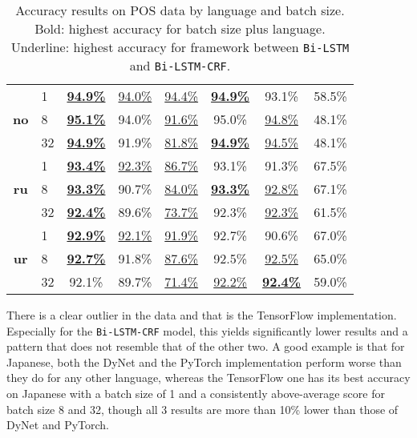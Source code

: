 \begin{table}[h]
\begin{tabular}{c l c c c|c c c}
        \cmidrule(lr){1-8}
        \multirow{3}{*}{\bfseries no}
        &  1 & \underline{\textbf{94.9\%}} & \underline{94.0\%} & \underline{94.4\%} & \underline{\textbf{94.9\%}} & 93.1\% & 58.5\% \\
        &  8 & \underline{\textbf{95.1\%}} & 94.0\% & \underline{91.6\%} & 95.0\% & \underline{94.8\%} & 48.1\% \\
        & 32 & \underline{\textbf{94.9\%}} & 91.9\% & \underline{81.8\%} & \underline{\textbf{94.9\%}} & \underline{94.5\%} & 48.1\% \\

        \cmidrule(lr){1-8}
        \multirow{3}{*}{\bfseries ru}
        &  1 & \underline{\textbf{93.4\%}} & \underline{92.3\%} & \underline{86.7\%} & 93.1\% & 91.3\% & 67.5\% \\
        &  8 & \underline{\textbf{93.3\%}} & 90.7\% & \underline{84.0\%} & \underline{\textbf{93.3\%}} & \underline{92.8\%} & 67.1\% \\
        & 32 & \underline{\textbf{92.4\%}} & 89.6\% & \underline{73.7\%} & 92.3\% & \underline{92.3\%} & 61.5\% \\

        \cmidrule(lr){1-8}
        \multirow{3}{*}{\bfseries ur}
        &  1 & \underline{\textbf{92.9\%}} & \underline{92.1\%} & \underline{91.9\%} & 92.7\% & 90.6\% & 67.0\% \\
        &  8 & \underline{\textbf{92.7\%}} & 91.8\% & \underline{87.6\%} & 92.5\% & \underline{92.5\%} & 65.0\% \\
        & 32 & 92.1\% & 89.7\% & \underline{71.4\%} & \underline{92.2\%} & \underline{\textbf{92.4\%}} & 59.0\% \\
        \bottomrule
    \end{tabular}
    \caption{%
      Accuracy results on POS data by language and batch size.
      Bold: highest accuracy for batch size plus language.
      Underline: highest accuracy for framework between
      \texttt{Bi-LSTM} and \texttt{Bi-LSTM-CRF}.
    }\label{table:acc-total-pos}
\end{table}


There is a clear outlier in the data and that is the TensorFlow implementation.
Especially for the \texttt{Bi-LSTM-CRF} model, this yields significantly lower
results and a pattern that does not resemble that of the other two. A good
example is that for Japanese, both the DyNet and the PyTorch implementation
perform worse than they do for any other language, whereas the TensorFlow one
has its best accuracy on Japanese with a batch size of 1 and  a consistently
above-average score for batch size 8 and 32, though all 3 results are more than
10\% lower than those of DyNet and PyTorch.

